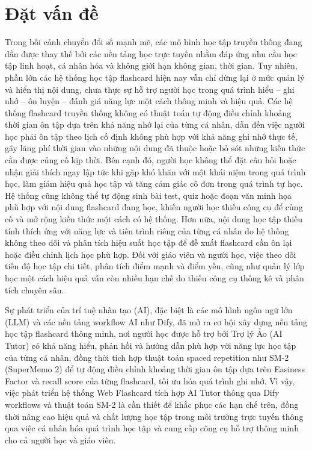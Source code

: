 \documentclass[../DoAn.tex]{subfiles}
\begin{document}
\section{Đặt vấn đề}
\label{section:1.2}
Trong bối cảnh chuyển đổi số mạnh mẽ, các mô hình học tập truyền thống đang dần được thay thế bởi các nền tảng học trực tuyến nhằm đáp ứng nhu cầu học tập linh hoạt, cá nhân hóa và không giới hạn không gian, thời gian. Tuy nhiên, phần lớn các hệ thống học tập flashcard hiện nay vẫn chỉ dừng lại ở mức quản lý và hiển thị nội dung, chưa thực sự hỗ trợ người học trong quá trình hiểu – ghi nhớ – ôn luyện – đánh giá năng lực một cách thông minh và hiệu quả. Các hệ thống flashcard truyền thống không có thuật toán tự động điều chỉnh khoảng thời gian ôn tập dựa trên khả năng nhớ lại của từng cá nhân, dẫn đến việc người học phải ôn tập theo lịch cố định không phù hợp với khả năng ghi nhớ thực tế, gây lãng phí thời gian vào những nội dung đã thuộc hoặc bỏ sót những kiến thức cần được củng cố kịp thời. Bên cạnh đó, người học không thể đặt câu hỏi hoặc nhận giải thích ngay lập tức khi gặp khó khăn với một khái niệm trong quá trình học, làm giảm hiệu quả học tập và tăng cảm giác cô đơn trong quá trình tự học. Hệ thống cũng không thể tự động sinh bài test, quiz hoặc đoạn văn minh họa phù hợp với nội dung flashcard đang học, khiến người học thiếu công cụ để củng cố và mở rộng kiến thức một cách có hệ thống. Hơn nữa, nội dung học tập thiếu tính thích ứng với năng lực và tiến trình riêng của từng cá nhân do hệ thống không theo dõi và phân tích hiệu suất học tập để đề xuất flashcard cần ôn lại hoặc điều chỉnh lịch học phù hợp. Đối với giáo viên và người học, việc theo dõi tiến độ học tập chi tiết, phân tích điểm mạnh và điểm yếu, cũng như quản lý lớp học một cách hiệu quả vẫn còn nhiều hạn chế do thiếu công cụ thống kê và phân tích chuyên sâu.

Sự phát triển của trí tuệ nhân tạo (AI), đặc biệt là các mô hình ngôn ngữ lớn (LLM) và các nền tảng workflow AI như Dify, đã mở ra cơ hội xây dựng nền tảng học tập flashcard thông minh, nơi người học được hỗ trợ bởi Trợ lý Ảo (AI Tutor) có khả năng hiểu, phản hồi và hướng dẫn phù hợp với năng lực học tập của từng cá nhân, đồng thời tích hợp thuật toán spaced repetition như SM-2 (SuperMemo 2) để tự động điều chỉnh khoảng thời gian ôn tập dựa trên Easiness Factor và recall score của từng flashcard, tối ưu hóa quá trình ghi nhớ. Vì vậy, việc phát triển hệ thống Web Flashcard tích hợp AI Tutor thông qua Dify workflows và thuật toán SM-2 là cần thiết để khắc phục các hạn chế trên, đồng thời nâng cao hiệu quả và chất lượng học tập trong môi trường trực tuyến thông qua việc cá nhân hóa quá trình học tập và cung cấp công cụ hỗ trợ thông minh cho cả người học và giáo viên.
\end{document}
